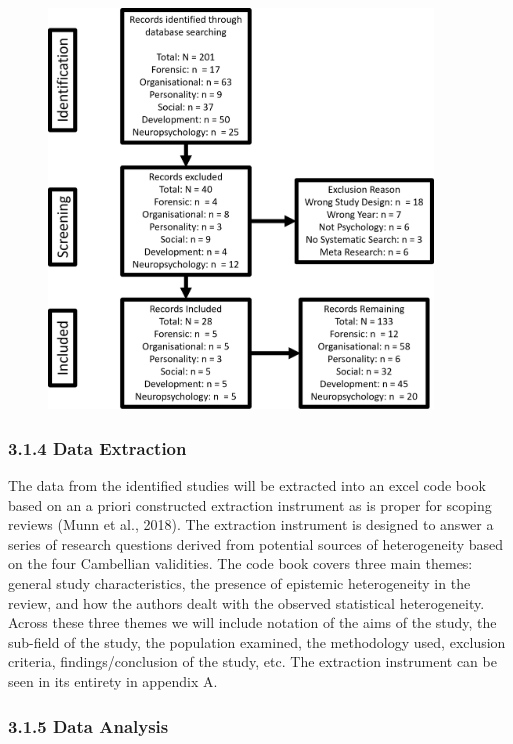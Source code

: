\documentclass[
  letterpaper,
  DIV=11,
  numbers=noendperiod]{scrartcl}
\begin{document}
\begin{figure}

{\centering \includegraphics[width=4.02083in,height=\textheight]{prisma_flow.png}

}

\end{figure}

\hypertarget{data-extraction}{%
\subsubsection{3.1.4 Data Extraction}\label{data-extraction}}

The data from the identified studies will be extracted into an excel
code book based on an a priori constructed extraction instrument as is
proper for scoping reviews (Munn et al., 2018). The extraction
instrument is designed to answer a series of research questions derived
from potential sources of heterogeneity based on the four Cambellian
validities. The code book covers three main themes: general study
characteristics, the presence of epistemic heterogeneity in the review,
and how the authors dealt with the observed statistical heterogeneity.
Across these three themes we will include notation of the aims of the
study, the sub-field of the study, the population examined, the
methodology used, exclusion criteria, findings/conclusion of the study,
etc. The extraction instrument can be seen in its entirety in appendix
A.

\hypertarget{data-analysis}{%
\subsubsection{3.1.5 Data Analysis}\label{data-analysis}}
\end{document}
